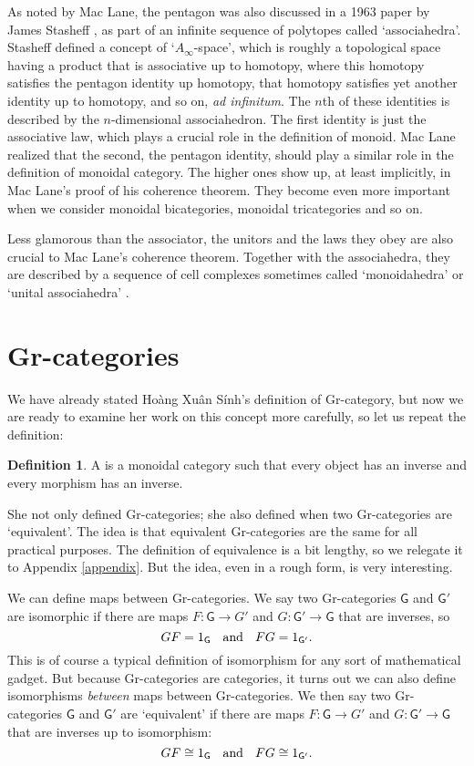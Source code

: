 \documentclass[reqno]{amsart}
\newcommand{\maps}{\colon}    %
\newcommand{\G}{{\mathsf{G}}}   %
\newcommand{\define}[1]{\textbf{\boldmath{#1}}}
\theoremstyle{definition}
\newtheorem{defn}[thm]{Definition}
\begin{document}
As noted by Mac Lane, the pentagon was also discussed in a 1963 paper by James Stasheff \cite{S63}, as part of an infinite sequence of polytopes called
`associahedra'.  Stasheff defined a concept of `$A_\infty$-space',
which is roughly a topological space having a product that is
associative up to homotopy, where this homotopy satisfies the pentagon
identity up homotopy, that homotopy satisfies yet another identity up
to homotopy, and so on, \textit{ad infinitum}.  The $n$th of these
identities is described by the $n$-dimensional associahedron.  The
first identity is just the associative law, which plays a crucial role
in the definition of monoid.  Mac Lane realized that the second, the pentagon
identity, should play a similar role in the definition of monoidal
category.  The higher ones show up, at least implicitly, in Mac Lane's
proof of his coherence theorem.  They become even more important when
we consider monoidal bicategories, monoidal tricategories and so on.  

Less glamorous than the associator, the unitors and the laws they obey
are also crucial to Mac Lane's coherence theorem.  Together with the associahedra, they are described by a sequence of cell complexes sometimes called `monoidahedra' \cite{T99} or `unital associahedra' \cite{MT11}.    

\section{Gr-categories}
\label{sec:Gr}

We have already stated Ho\`ang Xu\^an S\'inh's definition of Gr-category, but now we are ready to examine her work on this concept more carefully, so let us repeat the definition:

\begin{defn}
A \define{Gr-category} is a monoidal category such that every object has an inverse and every morphism has an inverse.
\end{defn}

She not only defined Gr-categories; she also defined when two Gr-categories are `equivalent'.    The idea is that equivalent Gr-categories are the same for all practical purposes.   The definition of equivalence is a bit lengthy, so we relegate it to Appendix \ref{appendix}.   But the idea, even in a rough form, is very interesting.  

We can define maps between Gr-categories.   We say two Gr-categories $\G$ and $\G'$ are isomorphic if there are maps $F \maps \G \to G'$ and $G \maps \G' \to \G$ that are inverses, so
\[    GF = 1_\G \textrm{ \; and \; } FG = 1_{\G'}   .\]
This is of course a typical definition of isomorphism for any sort of mathematical gadget.  But because Gr-categories are categories, it turns out we can also define isomorphisms \emph{between} maps between Gr-categories.  We then say two Gr-categories $\G$ and $\G'$ are `equivalent' if there are maps $F \maps \G \to G'$ and $G \maps \G' \to \G$ that are inverses up to isomorphism:
\[    GF \cong 1_\G \textrm{ \; and \; } FG \cong 1_{\G'}   .\]
\end{document}

